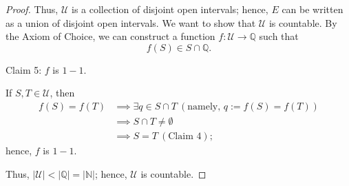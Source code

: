 \documentclass{amsart}
\theoremstyle{definition}
\begin{document}
\begin{proof}
    Thus, $\mathcal{U}$ is a collection of disjoint open intervals; hence, $E$ can be written as a union of disjoint open intervals. We want to show that $\mathcal{U}$ is countable. By the Axiom of Choice, we can construct a function $f: \mathcal{U} \to \mathbb{Q}$ such that
    \[
    f(S) \in S \cap \mathbb{Q}.
    \]

    Claim 5: $f$ is $1-1$.

    If $S,T \in \mathcal{U}$, then
    \begin{align*}
        f(S) = f(T) &\implies \exists q \in S \cap T \ (\text{namely, $q := f(S) = f(T)$}) \\
        &\implies S \cap T \neq \emptyset \\
        &\implies S = T \ (\text{Claim 4}); 
    \end{align*}
    hence, $f$ is $1-1$.

    Thus, $\vert \mathcal{U} \vert < \vert \mathbb{Q} \vert = \vert \mathbb{N} \vert$; hence, $\mathcal{U}$ is countable.
\end{proof}
\end{document}
